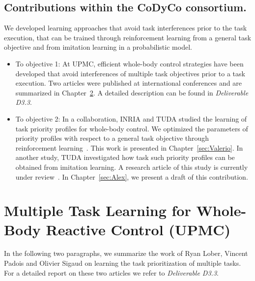 \documentclass[12pt,a4paper,twoside]{report}
\begin{document}
\section{Contributions within the CoDyCo consortium.} We developed learning approaches that avoid task interferences prior to the task execution,  
that can be trained through reinforcement learning from a general task objective and from imitation learning in a probabilistic model. 
\begin{itemize}
 \item To objective 1: At UPMC, efficient whole-body control strategies have been developed that 
avoid interferences of multiple task objectives prior to a task execution. Two articles were published at international conferences and 
are summarized in Chapter~\ref{sec:Ryan}. A detailed description can be found in \textit{Deliverable D3.3}. 
\item To objective 2: In a collaboration, INRIA and TUDA studied the learning of task priority profiles for whole-body control. We optimized the parameters of priority profiles with respect to a general task objective through reinforcement learning~\cite{Modugno_PICRA_2016}. This work is presented in 
Chapter~\ref{sec:Valerio}. 
\newline In another study, TUDA investigated how task such priority profiles can be obtained from imitation learning. 
A research article of this study is currently under review~\cite{Paraschos_2017}. In Chapter~\ref{sec:Alex}, we present a draft of this contribution. 
\end{itemize}


\chapter{Multiple Task Learning for Whole-Body Reactive Control (UPMC)}\label{sec:Ryan}

In the following two paragraphs, we summarize the work of Ryan Lober, Vincent Padois and Olivier Sigaud on 
learning the task prioritization of multiple tasks. For a detailed report on these two articles we refer to 
\textit{Deliverable D3.3}.
\end{document}
